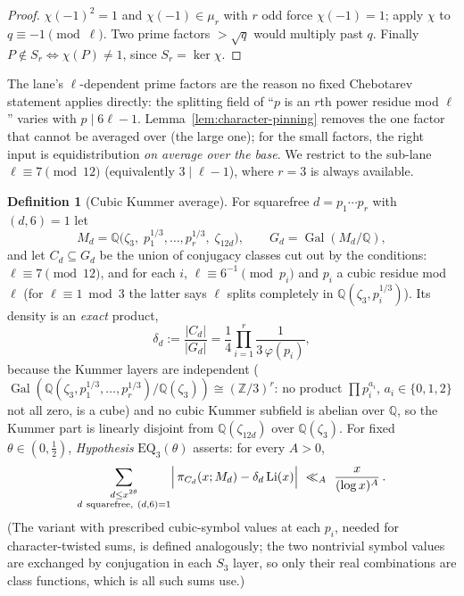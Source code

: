 \documentclass[11pt]{article}
\theoremstyle{plain}
\theoremstyle{definition}
\newtheorem{definition}[theorem]{Definition}
\theoremstyle{remark}
\newcommand{\Z}{\mathbb Z}
\newcommand{\Q}{\mathbb Q}
\newcommand{\Gal}{\operatorname{Gal}}
\begin{document}
\begin{proof}
$\chi(-1)^2=1$ and $\chi(-1)\in\mu_r$ with $r$ odd force $\chi(-1)=1$;
apply $\chi$ to $q\equiv-1\pmod\ell$.  Two prime factors $>\sqrt q$
would multiply past $q$.  Finally $P\notin S_r\iff\chi(P)\ne1$, since
$S_r=\ker\chi$.
\end{proof}

The lane's $\ell$-dependent prime factors are the reason no fixed
Chebotarev statement applies directly: the splitting field of ``$p$ is
an $r$th power residue mod $\ell$'' varies with $p\mid6\ell-1$.
Lemma~\ref{lem:character-pinning} removes the one factor that cannot be
averaged over (the large one); for the small factors, the right input
is equidistribution \emph{on average over the base}.  We restrict to
the sub-lane $\ell\equiv7\pmod{12}$ (equivalently $3\mid\ell-1$), where
$r=3$ is always available.

\begin{definition}[Cubic Kummer average]\label{def:eq3}
For squarefree $d=p_1\cdots p_r$ with $(d,6)=1$ let
\[
  M_d=\Q\bigl(\zeta_3,\;p_1^{1/3},\dots,p_r^{1/3},\;\zeta_{12d}\bigr),
  \qquad G_d=\Gal(M_d/\Q),
\]
and let $C_d\subseteq G_d$ be the union of conjugacy classes cut out by
the conditions: $\ell\equiv7\pmod{12}$, and for each $i$,
$\ell\equiv6^{-1}\pmod{p_i}$ and $p_i$ a cubic residue mod $\ell$ (for
$\ell\equiv1\bmod3$ the latter says $\ell$ splits completely in
$\Q(\zeta_3,p_i^{1/3})$).  Its density is an \emph{exact} product,
\[
  \delta_d:=\frac{|C_d|}{|G_d|}
  =\frac14\prod_{i=1}^{r}\frac1{3\,\varphi(p_i)},
\]
because the Kummer layers are independent
($\Gal(\Q(\zeta_3,p_1^{1/3},\dots,p_r^{1/3})/\Q(\zeta_3))\cong(\Z/3)^r$:
no product $\prod p_i^{a_i}$, $a_i\in\{0,1,2\}$ not all zero, is a
cube) and no cubic Kummer subfield is abelian over $\Q$, so the Kummer
part is linearly disjoint from $\Q(\zeta_{12d})$ over $\Q(\zeta_3)$.
For fixed $\theta\in(0,\tfrac12)$, \emph{Hypothesis}
$\mathrm{EQ}_3(\theta)$ asserts: for every $A>0$,
\[
  \sum_{\substack{d\le x^{2\theta}\\ d\ \text{squarefree},\ (d,6)=1}}
  \Bigl|\,\pi_{C_d}(x;M_d)-\delta_d\operatorname{Li}(x)\Bigr|
  \ \ll_A\ \frac{x}{(\log x)^{A}}\,.
\]
(The variant with prescribed cubic-symbol values at each $p_i$, needed
for character-twisted sums, is defined analogously; the two nontrivial
symbol values are exchanged by conjugation in each $S_3$ layer, so
only their real combinations are class functions, which is all such
sums use.)
\end{definition}
\end{document}
